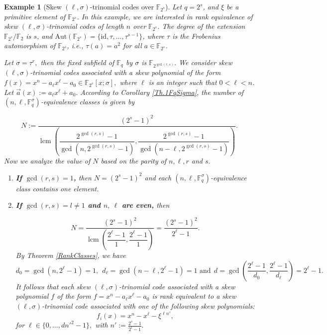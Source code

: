 \documentclass[12pt,paper]{article}
\theoremstyle{plain}
\newtheorem{example}[theorem]{Example}
\newcommand{\Fq}{\mathbb{F}_{q}}
\DeclareMathOperator{\lcm}{lcm}
\begin{document}
\begin{example}[Skew $(\ell,\sigma)$-trinomial codes over $ \mathbb{F}_{2^s}$]

Let $q = 2^s$, and $\xi$ be a primitive element of $\mathbb{F}_{2^s}$. In this example, we are interested in rank equivalence of  skew $(\ell,\sigma)$-trinomial codes of length $n$ over $\mathbb{F}_{2^s}$. The degree of the extension   $\mathbb{F}_{2^s}/\mathbb{F}_2$ is $s$, and  $\text{Aut}(\mathbb{F}_{2^s}) = \{\text{id}, \tau, \ldots, \tau^{s-1}\}$, where $\tau$ is the Frobenius automorphism of $\mathbb{F}_{2^s}$, i.e., $\tau(a) = a^2$ for all $a\in \mathbb{F}_{2^s}$. 

Let $\sigma=\tau^r,$ then the fixed subfield of $ \Fq$ by $ \sigma$ is $ \mathbb{F}_{2^{\gcd(r,s)}}.$
We consider skew $(\ell,\sigma)$-trinomial  codes   associated with  a skew polynomial of the form $f(x) =x^{n}-a_{\ell}x^{\ell}-a_0\in \mathbb{F}_{2^s}[x;\sigma],$ where $\ell$ is an integer such that $0<\ell <n$.  Let $\vec{a}(x):=   a_{\ell}x^{\ell}+a_0 .$ According to Corollary \ref{Th.1FqSigma}, the number of $( n,\ell, \Fq^{\sigma} )$-equivalence classes is given by  
 
 $$ N:=\dfrac{(2^s-1)^2}{ \lcm\left(\dfrac{2^{\gcd(r,s)}-1}{\gcd( n , 2^{\gcd(r,s)}-1)}, \dfrac{2^{\gcd(r,s)}-1}{\gcd( n-\ell, 2^{\gcd(r,s)}-1)}  \right)} . 
 $$ 
 Now we analyze the value of $N$  based on the parity of $n,\ell, r$ and $s.$
 \begin{enumerate}
\item \textbf{If $\gcd(r,s)=1$,} then $ N= (2^s-1)^2$ and each $( n,\ell, \Fq^{\sigma})$-equivalence  class contains one element.
\item \textbf{If $\gcd(r,s)= l\neq 1$ and $n,\ \ell$ are even,} then 

$$ N=\dfrac{(2^s-1)^2}{ \lcm\left(\dfrac{2^{\ell}-1}{1}, \dfrac{2^{\ell}-1}{1}  \right)}= \frac{(2^s-1)^2}{2^{\ell}-1}.$$
By Theorem \ref{RankClasses}, we have 
     $$d_0=\gcd( n, 2^{\ell}-1)= 1,\ \ d_{\ell}= \gcd( n-\ell, 2^{\ell}-1)= 1 \text{ and} \ \  d=\gcd\left( \frac{ 2^{\ell}-1}{d_0}, \frac{2^{\ell}-1}{d_{\ell}}\right)=2^{\ell}-1.$$
 It follows that each  skew $(\ell,\sigma)$-trinomial  code associated with a skew  polynomial $f$ of the form  $f =x^{n}- a_{\ell} x^{\ell}-a_0$ is rank equivalent to a skew $(\ell,\sigma)$-trinomial  code  associated with one of the following  skew polynomials: 
  $$f_i(x)= x^n- x^{\ell}- \xi^{\ell n'},$$
  for $\ell \in \{ 0,\ldots, d n'^2-1\},$ with $ n':= \frac{2^s-1}{2^l-1}.$
  


\end{enumerate}
\end{example}
\end{document}
